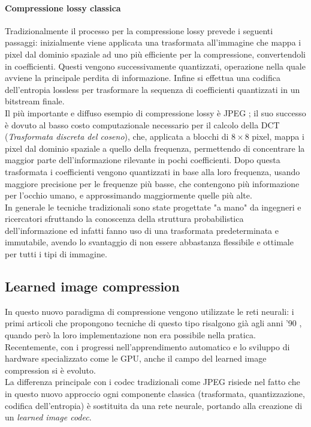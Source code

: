 \paragraph{Compressione lossy classica}
Tradizionalmente il processo per la compressione lossy prevede i seguenti passaggi: inizialmente viene applicata una trasformata all'immagine che mappa i pixel dal dominio spaziale ad uno più efficiente per la compressione, convertendoli in coefficienti. Questi vengono successivamente quantizzati, operazione nella quale avviene la principale perdita di informazione. Infine si effettua una codifica dell'entropia lossless per trasformare la sequenza di coefficienti quantizzati in un bitstream finale.\\
Il più importante e diffuso esempio di compressione lossy è JPEG \cite{jpeg}; il suo successo è dovuto al basso costo computazionale necessario per il calcolo della DCT (\textit{Trasformata discreta del coseno}), che, applicata a blocchi di $8 \times 8 $ pixel, mappa i pixel dal dominio spaziale a quello della frequenza, permettendo di concentrare la maggior parte dell'informazione rilevante in pochi coefficienti. Dopo questa trasformata i coefficienti vengono quantizzati in base alla loro frequenza, usando maggiore precisione per le frequenze più basse, che contengono più informazione per l'occhio umano, e approssimando maggiormente quelle più alte. \\
In generale le tecniche tradizionali sono state progettate "a mano" da ingegneri e ricercatori sfruttando la conoscenza della struttura probabilistica dell'informazione ed infatti fanno uso di una trasformata predeterminata e immutabile, avendo lo svantaggio di non essere abbastanza flessibile e ottimale per tutti i tipi di immagine.
\subsection*{Learned image compression}
In questo nuovo paradigma di compressione vengono utilizzate le reti neurali: i primi articoli che propongono tecniche di questo tipo risalgono già agli anni '90 \cite{sonehara1989image, sicuranza1990artificial}, quando però la loro implementazione non era possibile nella pratica. Recentemente, con i progressi nell'apprendimento automatico e lo sviluppo di hardware specializzato come le GPU, anche il campo del learned image compression si è evoluto.\\
La differenza principale con i codec tradizionali come JPEG risiede nel fatto che in questo nuovo approccio ogni componente classica (trasformata, quantizzazione, codifica dell'entropia) è sostituita da una rete neurale, portando alla creazione di un \textit{learned image codec}.
